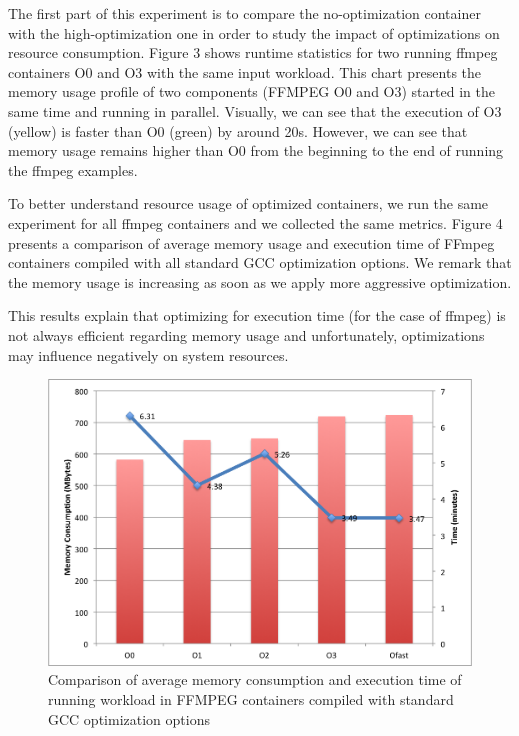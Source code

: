 The first part of this experiment is to compare the no-optimization container with the high-optimization one in order to study the impact of optimizations on resource consumption. Figure 3 shows runtime statistics for two running ffmpeg containers O0 and O3 with the same input workload. This chart presents the memory usage profile of two components (FFMPEG O0 and O3) started in the same time and running in parallel. Visually, we can see that the execution of O3 (yellow) is faster than O0 (green) by around 20s. However, we can see that memory usage remains higher than O0 from the beginning to the end of running the ffmpeg examples. 

To better understand resource usage of optimized containers, we run the same experiment for all ffmpeg containers and we collected the same metrics. Figure 4 presents a comparison of average memory usage and execution time of FFmpeg containers compiled with all standard GCC optimization options. We remark that the memory usage is increasing as soon as we apply more aggressive optimization.

This results explain that optimizing for execution time (for the case of ffmpeg) is not always efficient regarding memory usage and unfortunately, optimizations may influence negatively on system resources. 
\begin{figure}[h]
	\centering
	\includegraphics[scale=0.5]{Ressources/infra_ffmpeg_plot1.png}
	\caption{Comparison of average memory consumption and execution time of running workload in FFMPEG containers compiled with standard GCC optimization options}
\end{figure}






